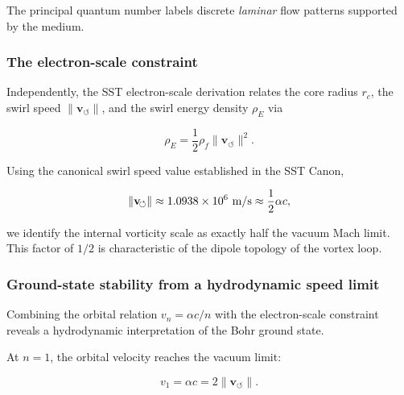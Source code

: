 \documentclass[10pt,reprint,aps,onecolumn,nofootinbib]{revtex4-2}
\begin{document}
        The principal quantum number labels discrete \emph{laminar} flow
        patterns supported by the medium.

    \subsubsection*{The electron-scale constraint}

        Independently, the SST electron-scale derivation relates the core radius
        $r_c$, the swirl speed $\lVert \mathbf{v}_{\!\boldsymbol{\circlearrowleft}}
\rVert$, and the swirl energy density $\rho_{\!E}$ via

        \begin{equation}
            \rho_{\!E}
            = \frac{1}{2}\rho_{\!f}
            \lVert \mathbf{v}_{\!\boldsymbol{\circlearrowleft}} \rVert^{2}.
        \end{equation}

        Using the canonical swirl speed value established in the SST Canon,

        \begin{equation}
            \lVert \mathbf{v}_{\!\boldsymbol{\circlearrowleft}}\rVert
            \approx 1.0938\times 10^{6}~{\rm m/s}
            \approx \frac{1}{2}\alpha c,
        \end{equation}

        we identify the internal vorticity scale as exactly half the vacuum Mach
        limit. This factor of $1/2$ is characteristic of the dipole topology
        of the vortex loop.

    \subsubsection*{Ground-state stability from a hydrodynamic speed limit}

        Combining the orbital relation $v_n = \alpha c / n$ with the
        electron-scale constraint reveals a hydrodynamic interpretation of the
        Bohr ground state.

        At $n=1$, the orbital velocity reaches the vacuum limit:

        \begin{equation}
            v_1 = \alpha c = 2 \lVert \mathbf{v}_{\!\boldsymbol{\circlearrowleft}}\rVert.
        \end{equation}
\end{document}
